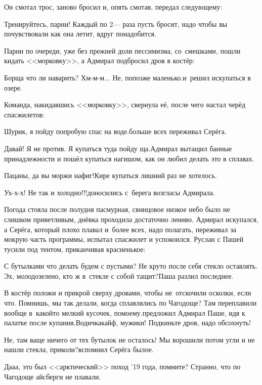Он смотал трос, заново бросил и, опять смотав, передал следующему:

\diagdash Тренируйтесь, парни! Каждый по 2\thinspace\nobreakdash--- раза пусть бросит, надо чтобы вы почувствовали как она летит, вдруг понадобится.

Парни по очереди, уже без прежней доли пессимизма, со~смешками, пошли кидать <<морковку>>, а Адмирал подбросил дров в костёр:

\diagdash Борща что ли наварить? Хм-м-м$\ldots$ Не, попозже маленько.\mdash и~решил искупаться в озере.

Команда, накидавшись <<морковку>>, свернула её, после чего настал черёд спасжилетов:

\diagdash Шурик, я пойду попробую спас на воде.\mdash больше всех переживал Серёга. 

\diagdash Давай! Я не против. Я купаться туда пойду ща.\mdash Адмирал вытащил банные принадлежности и пошёл купаться нагишом, как он любил делать это в сплавах.

\diagdash Пацаны, да вы моржи нафиг!\mdash Кире купаться лишний раз не хотелось. 

\diagdash Ух-х-х! Не так и холодно!!!\mdash доносились с~берега возгласы Адмирала.

Погода стояла после полудня пасмурная, свинцовое низкое небо было не слишком приветливым, днёвка проходила достаточно лениво. Адмирал искупался, а Серёга, который плохо плавал и~более всех, надо полагать, переживал за мокрую часть программы, испытал спасжилет и успокоился. Руслан с Пашей тусили под тентом, приканчивая красненькое:

\diagdash С бутылками что делать будем с пустыми? Не круто после себя стекло оставлять. Эх, молодо\sdash зелено, кто ж в~стекле с собой тащит?\mdash Паша разлил последнее.

\diagdash В костёр положи и прикрой сверху дровами, чтобы не~отскочили осколки, если что. Помнишь, мы так делали, когда сплавлялись по Чагодоще? Там переплавили вообще в~какой\sdash то мелкий кусочек, по\sdash моему.\mdash предложил Адмирал Паше, идя к палатке после купания.\mdash Водичка\mdash кайф, мужики! Подкиньте дров, надо обсохнуть!

\diagdash Не, там ваще ничего от тех бутылок не осталось! Мы ворошили потом угли и не нашли стекла, приколи?\mdash вспомнил Серёга былое.

\diagdash Да\sdash а\sdash а, это был <<арктический>> поход '19 года, помните? Странно, что по Чагодоще айсберги не плавали.

